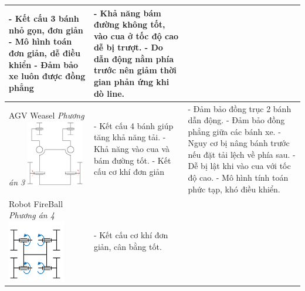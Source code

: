 \begin{longtable}{|p{4cm}|p{5cm}|p{5cm}|}
                - Kết cấu 3 bánh nhỏ gọn, đơn giản \newline
                - Mô hình toán đơn giản, dễ điều khiển \newline
                - Đảm bảo xe luôn được đồng phẳng & 
                - Khả năng bám đường không tốt, vào cua ở tốc độ cao dễ bị trượt. \newline
                - Do dẫn động nằm phía trước nên giảm thời gian phản ứng khi dò line. \\
                \hline
                AGV Weasel \newline
                \textit{Phương án 3} \newline
                \includegraphics[width=2.5cm]{pictures/chapter2/chapter2_pic_3.png} & 
                - Kết cấu 4 bánh giúp tăng khả năng tải. \newline
                - Khả năng vào cua và bám đường tốt. \newline
                - Kết cấu cơ khí đơn giản & 
                - Đảm bảo đồng trục 2 bánh dẫn động. \newline
                - Đảm bảo đồng phẳng giữa các bánh xe. \newline
                - Nguy cơ bị nâng bánh trước nếu đặt tải lệch về phía sau. \newline
                - Dễ bị lật khi vào cua với tốc độ cao. \newline
                - Mô hình tính toán phức tạp, khó điều khiển. \\
                \hline
                Robot FireBall \newline
                \textit{Phương án 4} \newline
                \includegraphics[width=2.5cm]{pictures/chapter2/chapter2_pic_4.png} &
                - Kết cấu cơ khí đơn giản, cân bằng tốt. \newline

\end{longtable}
